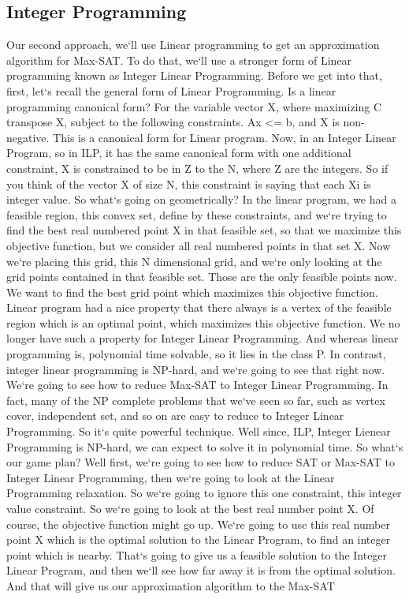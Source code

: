 \subsection{Integer Programming}
Our second approach, we`ll use Linear programming to get an approximation algorithm for Max-SAT\@.
To do that, we`ll use a stronger form of Linear programming known as Integer Linear Programming.
Before we get into that, first, let`s recall the general form of Linear Programming.
Is a linear programming canonical form? For the variable vector X, where maximizing C transpose X, subject to the following constraints.
Ax \textless{}= b, and X is non-negative.
This is a canonical form for Linear program.
Now, in an Integer Linear Program, so in ILP, it has the same canonical form with one additional constraint, X is constrained to be in Z to the N, where Z are the integers.
So if you think of the vector X of size N, this constraint is saying that each Xi is integer value.
So what`s going on geometrically? In the linear program, we had a feasible region, this convex set, define by these constraints, and we`re trying to find the best real numbered point X in that feasible set, so that we maximize this objective function, but we consider all real numbered points in that set X\@.
Now we`re placing this grid, this N dimensional grid, and we`re only looking at the grid points contained in that feasible set.
Those are the only feasible points now.
We want to find the best grid point which maximizes this objective function.
Linear program had a nice property that there always is a vertex of the feasible region which is an optimal point, which maximizes this objective function.
We no longer have such a property for Integer Linear Programming.
And whereas linear programming is, polynomial time solvable, so it lies in the class P\@.
In contrast, integer linear programming is NP-hard, and we`re going to see that right now.
We`re going to see how to reduce Max-SAT to Integer Linear Programming.
In fact, many of the NP complete problems that we`ve seen so far, such as vertex cover, independent set, and so on are easy to reduce to Integer Linear Programming.
So it`s quite powerful technique.
Well since, ILP, Integer Lienear Programming is NP-hard, we can expect to solve it in polynomial time.
So what`s our game plan? Well first, we`re going to see how to reduce SAT or Max-SAT to Integer Linear Programming, then we`re going to look at the Linear Programming relaxation.
So we`re going to ignore this one constraint, this integer value constraint.
So we`re going to look at the best real number point X\@.
Of course, the objective function might go up.
We`re going to use this real number point X which is the optimal solution to the Linear Program, to find an integer point which is nearby.
That`s going to give us a feasible solution to the Integer Linear Program, and then we`ll see how far away it is from the optimal solution.
And that will give us our approximation algorithm to the Max-SAT

